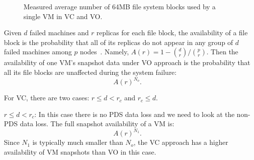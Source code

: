 \begin{figure}[htbp]
  \centering
  \caption{Measured average number of 64MB file system blocks used by a single VM in
VC and VO. }
  \label{fig:vm-links}
\end{figure}

Given $d$ failed machines and $r$ replicas for each file block,
the availability of a file block is the probability that  
all of its replicas do not appear in any group of $d$ failed machines among $p$ nodes~\cite{CoHadoop2011}. 
Namely, 
$
A(r) = 1-\binom{d}{r}/ \binom{p}{r}. 
$
Then the availability of one VM's snapshot data under VO approach is the probability that
 all its file blocks  are unaffected during the system failure:
\[
A(r)^{N_o}. 
\]

For VC, there are two cases: $r \le d<r_c$ and $r_c \leq d$.  

\noindent $r \le d<r_c$:  In this case there is no PDS data loss and we need to look at the non-PDS data loss. 
The full snapshot availability of a VM is: 
\[
A(r)^{N_1}.
\]
Since $N_1$ is typically much smaller than $N_o$, 
the VC approach has a higher availability of VM snapshots than VO in this case.

